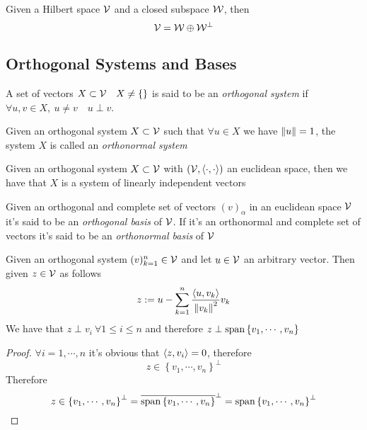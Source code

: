 \documentclass[../complete.tex]{subfiles}
\begin{document}
\begin{cor}
	Given a Hilbert space $\mathcal{V}$ and a closed subspace $\mathcal{W}$, then
	\begin{equation}
		\mathcal{V}=\mathcal{W}\oplus\mathcal{W}^\perp
		\label{eq:closedirectsum}
	\end{equation}
\end{cor}
\subsection{Orthogonal Systems and Bases}
\begin{dfn}
	A set of vectors $X\subset\mathcal{V}\quad X\ne\{\}$ is said to be an \textit{orthogonal system} if $\forall u,v\in X,\ u\ne v\quad u\perp v$.\\
\end{dfn}
\begin{dfn}
	Given an orthogonal system $X\subset\mathcal{V}$ such that $\forall u\in X$ we have $\norm{u}=1$, the system $X$ is called an \textit{orthonormal system}
\end{dfn}
\begin{thm}
	Given an orthogonal system $X\subset\mathcal{V}$ with $(\mathcal{V},\langle \cdot, \cdot \rangle)$ an euclidean space, then we have that $X$ is a system of linearly independent vectors
\end{thm}
\begin{dfn}[Basis]
	Given an orthogonal and complete set of vectors $(v)_\alpha$ in an euclidean space $\mathcal{V}$ it's said to be an \textit{orthogonal basis} of $\mathcal{V}$. If it's an orthonormal and complete set of vectors it's said to be an \textit{orthonormal basis} of $\mathcal{V}$
\end{dfn}
\begin{lem}
	Given an orthogonal system $(v)_{k=1}^n\in\mathcal{V}$ and let $u\in\mathcal{V}$ an arbitrary vector. Then given $z\in\mathcal{V}$ as follows
	\begin{equation*}
		z:=u-\sum_{k=1}^n\frac{\langle u, v_k \rangle}{\norm{v_k}^2}v_k
	\end{equation*}
	We have that $z\perp v_i\ \forall 1\le i\le n$ and therefore $z\perp\mathrm{span}\left\{ v_1,\cdots,v_n \right\}$
\end{lem}
\begin{proof}
	$\forall i=1,\cdots,n$ it's obvious that $\langle z, v_i \rangle=0$, therefore
	\begin{equation*}
		z\in\left\{ v_1,\cdots,v_n \right\}^\perp
	\end{equation*}
	Therefore
	\begin{equation*}
		z\in\left\{ v_1,\cdots,v_n \right\}^\perp=\overline{\mathrm{span}\left\{v_1,\cdots,v_n\right\}}^\perp=\mathrm{span}\left\{ v_1,\cdots,v_n \right\}^\perp
	\end{equation*}
\end{proof}
\end{document}
